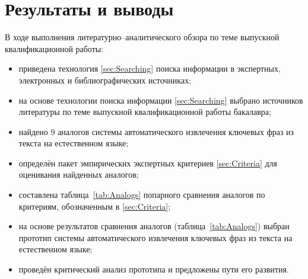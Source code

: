 \section{Результаты и выводы}
В ходе выполнения литературно--аналитического обзора по теме
выпускной квалификационной работы:
\begin{itemize}
  \item приведена технология \ref{sec:Searching} поиска информации в
экспертных, электронных и библиографических источниках;
  \item на основе технологии поиска информации \ref{sec:Searching}
выбрано \totalbibs источников литературы по теме выпускной
квалификационной работы бакалавра;
  \item найдено 9 аналогов системы автоматического извлечения
ключевых фраз из текста на естественном языке;
  \item определён пакет эмпирических экспертных критериев
\ref{sec:Criteria} для оценивания найденных аналогов;
  \item составлена таблица~\ref{tab:Analogs} попарного сравнения
аналогов по критериям, обозначенным в \ref{sec:Criteria};
  \item на основе результатов сравнения аналогов
(таблица~\ref{tab:Analogs}) выбран прототип системы автоматического
извлечения ключевых фраз из текста на естественном языке;
  \item проведён критический анализ прототипа и предложены пути его
развития.
\end{itemize}
